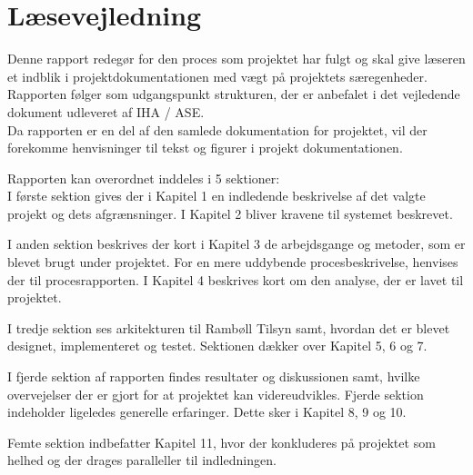 \chapter*{Læsevejledning}
Denne rapport redegør for den proces som projektet har fulgt og skal give læseren et indblik i projektdokumentationen med vægt på projektets særegenheder. Rapporten følger som udgangspunkt strukturen, der er anbefalet i det vejledende dokument udleveret af IHA / ASE.\\
Da rapporten er en del af den samlede dokumentation for projektet, vil der forekomme
henvisninger til tekst og figurer i projekt dokumentationen.


Rapporten kan overordnet inddeles i 5 sektioner:\\
I første sektion gives der i Kapitel 1 en indledende beskrivelse af det valgte projekt og
dets afgrænsninger. I Kapitel 2 bliver kravene til systemet beskrevet.

I anden sektion beskrives der kort i Kapitel 3 de arbejdsgange og metoder, som er blevet brugt
under projektet. For en mere uddybende procesbeskrivelse, henvises der til procesrapporten.
I Kapitel 4 beskrives kort om den analyse, der er lavet til projektet.

I tredje sektion ses arkitekturen til Rambøll Tilsyn samt, hvordan det er blevet designet, implementeret og testet. 
Sektionen dækker over Kapitel 5, 6 og 7.

I fjerde sektion af rapporten findes resultater og diskussionen samt, hvilke overvejelser
der er gjort for at projektet kan videreudvikles. Fjerde sektion indeholder ligeledes generelle erfaringer. 
Dette sker i Kapitel 8, 9 og 10.

Femte sektion indbefatter Kapitel 11, hvor der konkluderes på projektet som helhed og
der drages paralleller til indledningen.


